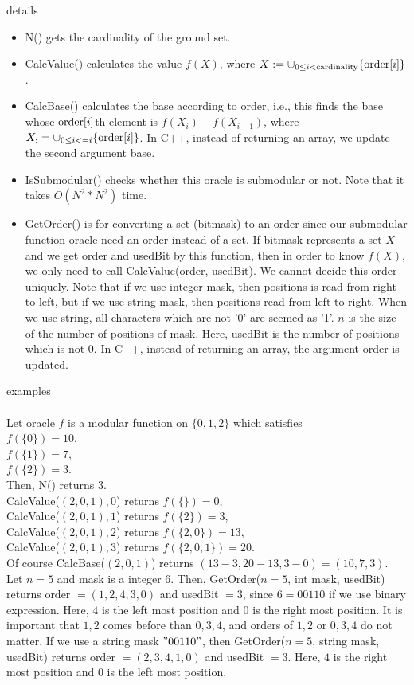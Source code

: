 \documentclass{article}
\begin{document}
{\sf details}
\begin{itemize}
\item N() gets the cardinality of the ground set.
\item CalcValue() calculates the value $f(X)$, where $X:=\cup _{0\leq i < {\rm cardinality}} {\rm \{ order }[i] \}$.
\item CalcBase() calculates the base according to order,
i.e., this finds the base whose ${\rm order}[i]$th element is $f(X_i)-f(X_{i-1})$,
where $X_:=\cup _{0\leq i <= i} {\rm \{order }[i] \}$.
In C++, instead of returning an array, we update the second argument base.
\item IsSubmodular() checks whether this oracle is submodular or not.
Note that it takes $O(N^2 * N^2)$ time.
\item GetOrder() is for converting a set (bitmask) to an order since our submodular function oracle need an order instead of a set.
If bitmask represents a set $X$ and we get order and usedBit by this function,
then in order to know $f(X)$, we only need to call CalcValue(order, usedBit).
We cannot decide this order uniquely.
Note that if we use integer mask, then positions is read from right to left, but if we use string mask, then positions read from left to right.
When we use string, all characters which are not '0' are seemed as '1'.
$n$ is the size of the number of positions of mask. Here, usedBit is the number of positions which is not $0$.
In C++, instead of returning an array, the argument order is updated.
\end{itemize}




\mbox{}

{\sf examples}\\ \mbox{}\\
Let oracle $f$ is a modular function on $\{ 0,1,2 \}$
which satisfies \\ $f(\{ 0 \})=10$,\\ $f(\{ 1\}) = 7$, \\ $f(\{ 2 \}) = 3$.\\
Then, N() returns $3$.\\
CalcValue($(2,0,1), 0$) returns $f(\{  \})=0$,\\
CalcValue($(2,0,1), 1$) returns $f(\{ 2 \})=3$,\\
CalcValue($(2,0,1), 2$) returns $f(\{ 2,0 \})=13$,\\
CalcValue($(2,0,1), 3$) returns $f(\{ 2,0,1 \})=20$.\\
Of course CalcBase($(2,0,1)$) returns $(13-3,20-13,3-0) = (10,7,3)$.
Let $n=5$ and mask is a integer $6$.
Then, GetOrder($n=5$, int mask, usedBit) returns order $=(1,2,4,3,0)$ and usedBit $=3$,
since $6=00110$ if we use binary expression.
Here, $4$ is the left most position and $0$ is the right most position.
It is important that $1,2$ comes before than $0,3,4$,
and orders of $1,2$ or $0,3,4$ do not matter.
If we use a string mask $" 00110" $,
then GetOrder($n=5$, string mask, usedBit) returns order $=(2,3,4,1,0)$ and usedBit $=3$.
Here, $4$ is the right most position and $0$ is the left most position.
\end{document}
